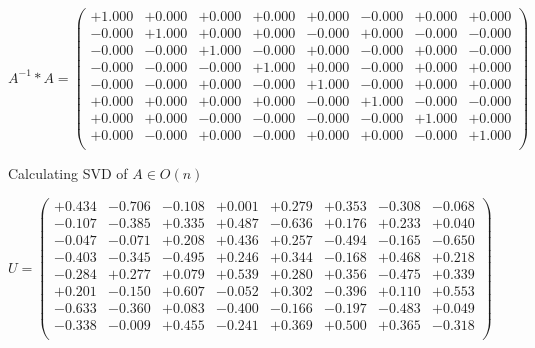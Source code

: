 \documentclass[9pt]{article}
\theoremstyle{plain}
\theoremstyle{definition}
\theoremstyle{remark}
\numberwithin{equation}{section}
\begin{document}
$A^{-1} *A = \left(
\begin{array}{
cccccccc}
+1.000 & +0.000 & +0.000 & +0.000 & +0.000 & -0.000 & +0.000 & +0.000 \\
-0.000 & +1.000 & +0.000 & +0.000 & -0.000 & +0.000 & -0.000 & -0.000 \\
-0.000 & -0.000 & +1.000 & -0.000 & +0.000 & -0.000 & +0.000 & -0.000 \\
-0.000 & -0.000 & -0.000 & +1.000 & +0.000 & -0.000 & +0.000 & +0.000 \\
-0.000 & -0.000 & +0.000 & -0.000 & +1.000 & -0.000 & +0.000 & +0.000 \\
+0.000 & +0.000 & +0.000 & +0.000 & -0.000 & +1.000 & -0.000 & -0.000 \\
+0.000 & +0.000 & -0.000 & -0.000 & -0.000 & -0.000 & +1.000 & +0.000 \\
+0.000 & -0.000 & +0.000 & -0.000 & +0.000 & +0.000 & -0.000 & +1.000 \\
\end{array}
\right)$ \newline 

Calculating SVD of  $A \in O(n)$

$U = \left(
\begin{array}{
cccccccc}
+0.434 & -0.706 & -0.108 & +0.001 & +0.279 & +0.353 & -0.308 & -0.068 \\
-0.107 & -0.385 & +0.335 & +0.487 & -0.636 & +0.176 & +0.233 & +0.040 \\
-0.047 & -0.071 & +0.208 & +0.436 & +0.257 & -0.494 & -0.165 & -0.650 \\
-0.403 & -0.345 & -0.495 & +0.246 & +0.344 & -0.168 & +0.468 & +0.218 \\
-0.284 & +0.277 & +0.079 & +0.539 & +0.280 & +0.356 & -0.475 & +0.339 \\
+0.201 & -0.150 & +0.607 & -0.052 & +0.302 & -0.396 & +0.110 & +0.553 \\
-0.633 & -0.360 & +0.083 & -0.400 & -0.166 & -0.197 & -0.483 & +0.049 \\
-0.338 & -0.009 & +0.455 & -0.241 & +0.369 & +0.500 & +0.365 & -0.318 \\
\end{array}
\right)$ \newline 
\end{document}
